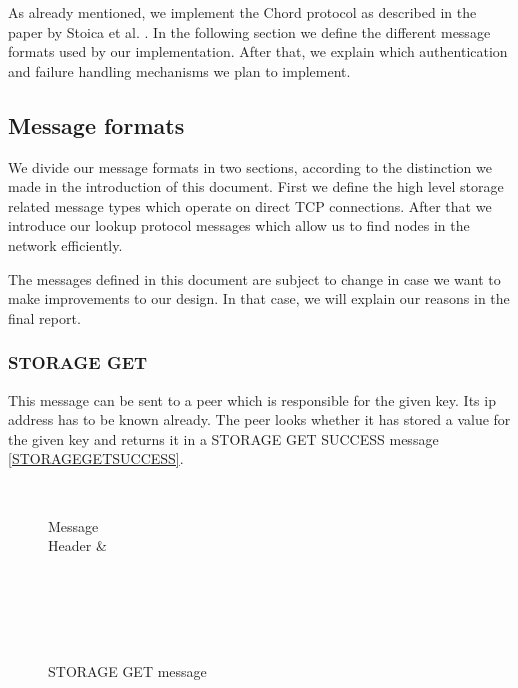 \documentclass[a4paper, 11pt]{article}
\begin{document}
As already mentioned, we implement the Chord protocol as described in the paper by Stoica et al. \cite{Chord}. In the following section we define the different message formats used by our implementation. After that, we explain which authentication and failure handling mechanisms we plan to implement.

\subsection{Message formats}

We divide our message formats in two sections, according to the distinction we made in the introduction of this document. First we define the high level storage related message types which operate on direct TCP connections. After that we introduce our lookup protocol messages which allow us to find nodes in the network efficiently.

The messages defined in this document are subject to change in case we want to make improvements to our design. In that case, we will explain our reasons in the final report.

\subsubsection{STORAGE GET}

This message can be sent to a peer which is responsible for the given key. Its ip address has to be known already. The peer looks whether it has stored a value for the given key and returns it in a STORAGE GET SUCCESS message \ref{STORAGEGETSUCCESS}.

\begin{figure}[H]
	\centering
	\begin{bytefield}[bitwidth=0.8em]{32}
		 \\
		\begin{rightwordgroup}{Message \\  Header}
			 & 
		\end{rightwordgroup} \\
		 \\
		\skippedwords \\
		 \\
	\end{bytefield}
	\caption{STORAGE GET message}
	\label{STORAGEGET}
\end{figure}
\end{document}

